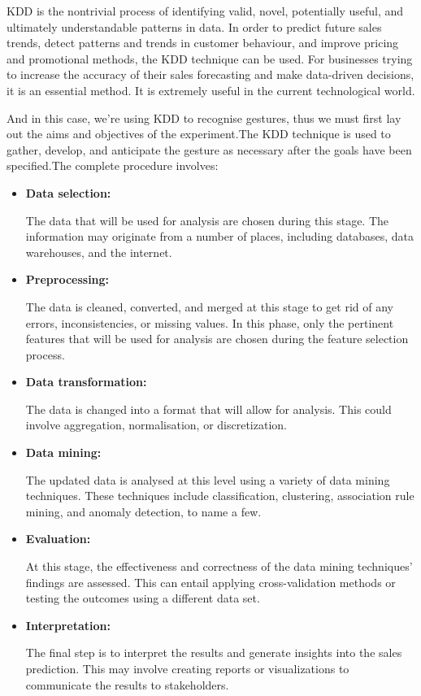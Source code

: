 KDD is the nontrivial process of identifying valid, novel, potentially useful, and ultimately understandable patterns in data\cite{fayyad:1996}. In order to predict future sales trends, detect patterns and trends in customer behaviour, and improve pricing and promotional methods, the KDD technique can be used. For businesses trying to increase the accuracy of their sales forecasting and make data-driven decisions, it is an essential method. It is extremely useful in the current technological world.\bigskip

And in this case, we're using KDD to recognise gestures, thus we must first lay out the aims and objectives of the experiment.The KDD technique is used to gather, develop, and anticipate the gesture as necessary after the goals have been specified.The complete procedure involves:\bigskip

\begin{itemize}
	\item \textbf{Data selection:}\smallskip

	The data that will be used for analysis are chosen during this stage. The information may originate from a number of places, including databases, data warehouses, and the internet.
 	\item \textbf{Preprocessing: }\smallskip 

	The data is cleaned, converted, and merged at this stage to get rid of any errors, inconsistencies, or missing values. In this phase, only the pertinent features that will be used for analysis are chosen during the feature selection process.
 	\item \textbf{Data transformation: }\smallskip 
	
	The data is changed into a format that will allow for analysis. This could involve aggregation, normalisation, or discretization.
 	\item \textbf{Data mining: }\smallskip 
 	
The updated data is analysed at this level using a variety of data mining techniques. These techniques include classification, clustering, association rule mining, and anomaly detection, to name a few.
 	\item \textbf{Evaluation: }\smallskip 
 	
	At this stage, the effectiveness and correctness of the data mining techniques' findings are assessed. This can entail applying cross-validation methods or testing the outcomes using a different data set.
 	\item \textbf{Interpretation: }\smallskip
  
	The final step is to interpret the results and generate insights into the sales prediction. This may involve creating reports or visualizations to communicate the results to stakeholders.
	
\end{itemize}

